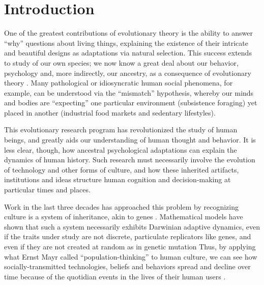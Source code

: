 

\section{Introduction}


One of the greatest contributions of evolutionary theory is the ability to answer ``why'' questions about living things, explaining the existence of their intricate and beautiful designs as adaptations via natural selection.  This success extends to study of our own species; we now know a great deal about our behavior, psychology and, more indirectly, our ancestry, as a consequence of evolutionary theory \citep{LalandBrown2002sense, Barkow1992adaptedmind}.  Many pathological or idiosyncratic human social phenomena, for example, can be understood via the ``mismatch'' hypothesis, whereby our minds and bodies are ``expecting'' one particular environment (subsistence foraging) yet placed in another (industrial food markets and sedentary lifestyles).  

This evolutionary research program has revolutionized the study of human beings, and greatly aids our understanding of human thought and behavior.  It is less clear, though, how ancestral psychological adaptations can explain the dynamics of human history.  Such research must necessarily involve the evolution of technology and other forms of culture, and how these inherited artifacts, institutions and ideas structure human cognition and decision-making at particular times and places.  

Work in the last three decades has approached this problem by recognizing culture is a system of inheritance, akin to genes \citep{Richerson2005:NBGA, durham1992coevolution}.  Mathematical models have shown that such a system necessarily exhibits Darwinian adaptive dynamics, even if the traits under study are not discrete, particulate replicators like genes, and even if they are not created at random as in genetic mutation \citep{boyd1985culture, Henrich2002}  Thus, by applying what Ernst Mayr called ``population-thinking'' to human culture, we can see how socially-transmitted technologies, beliefs and behaviors spread and decline over time because of the quotidian events in the lives of their human users \citep{Shennan2009, Mesoudi2006}.

